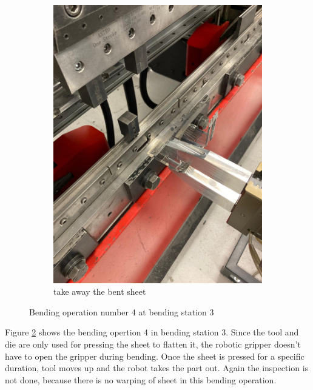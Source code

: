 \begin{figure}[h]
\begin{subfigure}[b]{0.32\textwidth}
        \includegraphics[width=\textwidth]{figures/bending/bending4-003.png}
        \caption{take away the bent sheet}
        \label{subfig:bending4-after}
    \end{subfigure}\hspace{0.1cm}
    \caption{Bending operation number 4 at bending station 3}
    \label{fig:bending-operation-4}
\end{figure}


Figure \ref{fig:bending-operation-4} shows the bending opertion 4 in bending station 3. Since the tool and die are only used for pressing the sheet to flatten it, the robotic gripper doesn't have to open the gripper during bending. Once the sheet is pressed for a specific duration, tool moves up and the robot takes the part out.  Again the inspection is not done, because there is no warping of sheet in this bending operation.


